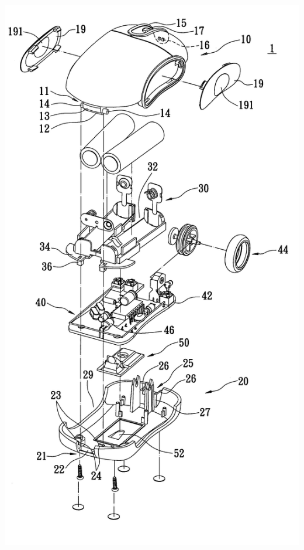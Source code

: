 \documentclass{beamer}
\newcommand{\fullPageImage}[2]{
	{
		\usebackgroundtemplate{\texttt{[image: \#1]}}
		\frame[plain]{#2}
	}
}
\begin{document}
\begin{frame}
\begin{center}
	\includegraphics[scale=0.2]{images/7119793-0-large.jpg}
	\end{center}
\end{frame}

\fullPageImage{images/optical-mouse-insight-1.jpg}{\transwipe}
\fullPageImage{images/optical-mouse-insight-2.jpg}{\transwipe}
\fullPageImage{images/optical-mouse-insight-3.jpg}{\transwipe}
\fullPageImage{images/optical-mouse-insight-4.jpg}{\transwipe}
\fullPageImage{images/optical-mouse-insight-5_1.jpg}{\transwipe}
\fullPageImage{images/optical-mouse-insight-6_0.jpg}{\transwipe}
\fullPageImage{images/optical-mouse-insight-7_1.jpg}{\transwipe}
\fullPageImage{images/optical-mouse-insight-8.jpg}{\transwipe}
\fullPageImage{images/optical-mouse-insight-9.jpg}{\transwipe}
\fullPageImage{images/optical-mouse-insight-10.jpg}{\transwipe}
\fullPageImage{images/optical-mouse-insight-11.jpg}{\transwipe}
\fullPageImage{images/optical-mouse-insight-12.jpg}{\transwipe}
\fullPageImage{images/optical-mouse-insight-13.jpg}{\transwipe}
\end{document}
